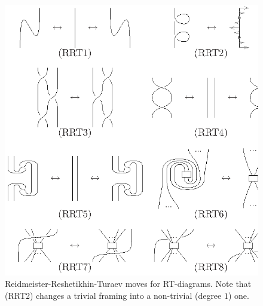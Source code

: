 \begin{figure}[p]
  \centering\includegraphics{fig-003}
  \caption{Reidmeister-Reshetikhin-Turaev moves for
    RT-diagrams. Note that (RRT2) changes a trivial framing
    into a non-trivial (degree $1$) one.}
  \label{fig:gc-rrt}
\end{figure}

